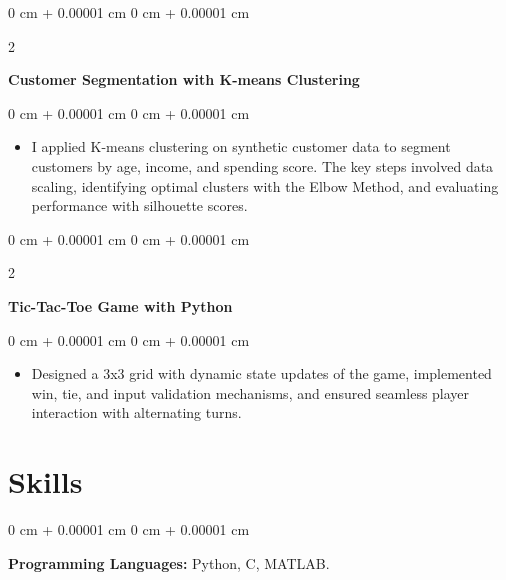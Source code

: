 \documentclass[10pt, letterpaper]{article}
\newenvironment{highlights}{
    \begin{itemize}[
        topsep=0.10 cm,
        parsep=0.10 cm,
        partopsep=0pt,
        itemsep=0pt,
        leftmargin=0 cm + 10pt
    ]
}{
    \end{itemize}
} %
\newenvironment{onecolentry}{
    \begin{adjustwidth}{
        0 cm + 0.00001 cm
    }{
        0 cm + 0.00001 cm
    }
}{
    \end{adjustwidth}
} %
\newenvironment{twocolentry}[2][]{
    \onecolentry
    \def\secondColumn{#2}
    \setcolumnwidth{\fill, 4.5 cm}
    \begin{paracol}{2}
}{
    \switchcolumn \raggedleft \secondColumn
    \end{paracol}
    \endonecolentry
} %
\begin{document}
        \vspace{0.2 cm}

        \begin{twocolentry}{
        }
            \textbf{Customer Segmentation with K-means Clustering
}\end{twocolentry}

        \vspace{0.10 cm}
        \begin{onecolentry}
            \begin{highlights}
                \item I applied K-means clustering on synthetic customer data to segment customers by age, income, and spending score. The key steps involved data scaling, identifying optimal clusters with the Elbow Method, and evaluating performance with silhouette scores.
            \end{highlights}
        \end{onecolentry}
        
    \vspace{0.2 cm}

        \begin{twocolentry}{
        }
            \textbf{Tic-Tac-Toe Game with Python}\end{twocolentry}

        \vspace{0.10 cm}
        \begin{onecolentry}
            \begin{highlights}
                \item Designed a 3x3 grid with dynamic state updates of the game, implemented win, tie, and input validation mechanisms, and ensured seamless player interaction with alternating turns.
            \end{highlights}
        \end{onecolentry}

    \vspace{0.6 cm}

       \vspace{0.15 cm}
       \section{Skills}   
        \begin{onecolentry}
        \textbf{Programming Languages:} Python, C, MATLAB.
        \end{onecolentry}

        \vspace{0.2 cm}
        
\end{document}
